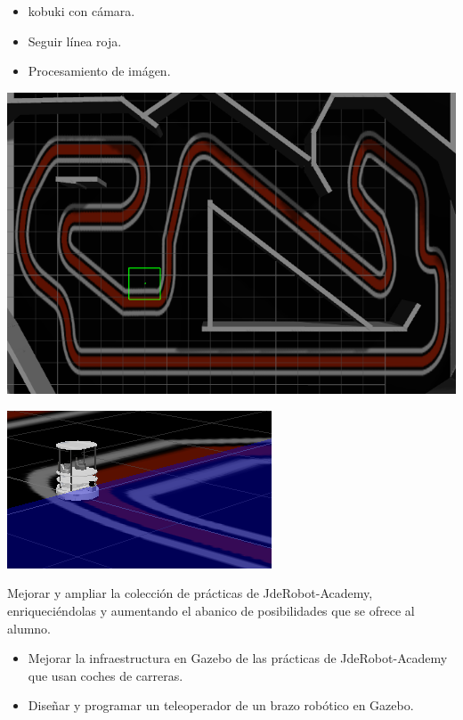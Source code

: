 \documentclass[notes,slidesec,a4]{seminar}
\begin{document}
\begin{hslide}
	\begin{itemize}
		\item kobuki con cámara.
		\item Seguir línea roja.
		\item Procesamiento de imágen.
	\end{itemize}
	\begin{minipage}[t]{0.47\textwidth}
		\includegraphics[width=\textwidth]{followline-world.png}
	\end{minipage}
	\begin{minipage}[t]{0.53\textwidth}
		\includegraphics[width=\textwidth]{kobukiMontmelo.png}
	\end{minipage}
\end{hslide}

\begin{hslide}
	Mejorar y ampliar la colección de prácticas de JdeRobot-Academy, enriqueciéndolas y aumentando el abanico de posibilidades que se ofrece al alumno.
	\begin{itemize}
		\item Mejorar la infraestructura en Gazebo de las prácticas de JdeRobot-Academy que usan coches de carreras.
		\item Diseñar y programar un teleoperador de un brazo robótico en Gazebo.
	\end{itemize}
\end{hslide}
\end{document}
